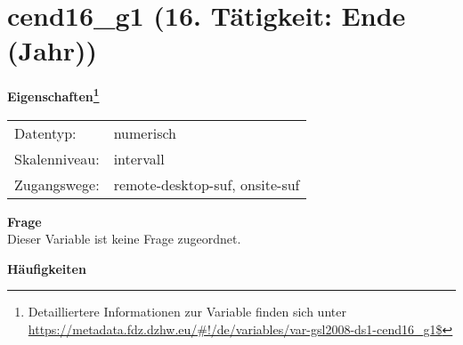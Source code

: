 
    \setcounter{footnote}{0}

    \vspace*{-1.8cm}
	\section{cend16\_g1 (16. Tätigkeit: Ende (Jahr))}
	\label{section:cend16_g1}



    \vspace*{0.5cm}
    \noindent\textbf{Eigenschaften\footnote{Detailliertere Informationen zur Variable finden sich unter
		\url{https://metadata.fdz.dzhw.eu/\#!/de/variables/var-gsl2008-ds1-cend16_g1$}}}\\
	\begin{tabularx}{\hsize}{@{}lX}
	Datentyp: & numerisch \\
	Skalenniveau: & intervall \\
	Zugangswege: &
	  remote-desktop-suf, 
	  onsite-suf
 \\
    \end{tabularx}



		\vspace*{0.5cm}
		\noindent\textbf{Frage}\\
		Dieser Variable ist keine Frage zugeordnet.





        		\vspace*{0.5cm}
                \noindent\textbf{Häufigkeiten}

